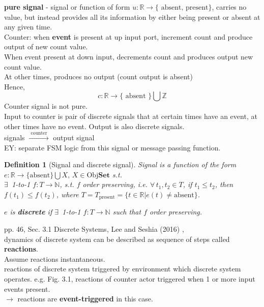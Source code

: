 \documentclass[10pt]{amsart}
\newtheorem{definition}{Definition}
\begin{document}
\begin{multicols*}{2}
\textbf{pure signal} - signal or function of form $u:\mathbb{R} \to \lbrace \text{ absent, present} \rbrace$, carries no value, but instead provides all its information by either being present or absent at any given time. \\

Counter: when \textbf{event} is present at up input port, increment count and produce output of new count value. \\
When event present at down input, decrements count and produces output new count value. \\
At other times, produces no output (count output is absent) \\

Hence, 
\[
c: \mathbb{R} \to \lbrace \text{ absent } \rbrace \bigcup \mathbb{Z}
\]
Counter signal is not pure. \\

Input to counter is pair of discrete signals that at certain times have an event, at other times have no event. Output is also discrete signals. \\

signals $\xrightarrow{ \text{ counter } }$ output signal \\

EY: separate FSM logic from this signal or message passing function.


\begin{definition}[Signal and discrete signal]
	Signal is a function of the form $e : \mathbb{R} \to \lbrace \text{absent}  \rbrace \bigcup X, \, X \in \text{Obj}{\mathbf{Set}}$ s.t. \\
	$\exists \,$ 1-to-1 $f: T \to \mathbb{N}$, s.t. $f$ order preserving, i.e. $\forall \, t_1, t_2 \in T$, if $t_1 \leq t_2$, then $f(t_1) \leq f(t_2)$, where $T = T_{\text{present}} = \lbrace t \in \mathbb{R} | e(t) \neq \text{absent} \rbrace$.

	$e$ is \textbf{discrete} if $\exists \,$ 1-to-1 $f:T\to \mathbb{N}$ such that $f$ order preserving.
\end{definition} 

pp. 46, Sec. 3.1 Discrete Systems, Lee and Seshia (2016) \cite{LeSe2016}, \\
dynamics of discrete system can be described as sequence of steps called \textbf{reactions}. \\
Assume reactions instantaneous. \\
reactions of discrete system triggered by environment which discrete system operates. e.g. Fig. 3.1, reactions of counter actor triggered when 1 or more input events present. \\
$\to$ reactions are \textbf{event-triggered} in this case.


\end{multicols*}
\end{document}
